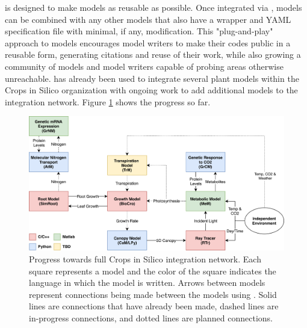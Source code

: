\documentclass[journal]{IEEEtran}
\newcommand{\todo}[1]{{\color{red}{#1}}}
\newcommand{\pkg}{{\tt \todo{cis\_interface}}{}}
\begin{document}
{\pkg} is designed to make models as reusable as possible. Once integrated via {\pkg}, models can be combined with any other models that also have a {\pkg} wrapper and YAML specification file with minimal, if any, modification. This "plug-and-play" approach to models encourages model writers to make their codes public in a reusable form, generating citations and reuse of their work, while also growing a community of models and model writers capable of probing areas otherwise unreachable. 
%
{\pkg} has already been used to integrate several plant models within the Crops in Silico organization \citep{Marshall-Colon2017} with ongoing work to add additional models to the integration network. Figure \ref{fig:network} shows the progress so far. 
%
\ifinclfig
 	\begin{figure}[htbp]
	\begin{center}
	\includegraphics[width=\columnwidth,keepaspectratio]{./images/CiS-Languages.png}
	\caption{Progress towards full Crops in Silico integration network. Each square represents a model and the color of the square indicates the language in which the model is written. Arrows between models represent connections being made between the models using {\pkg}. Solid lines are connections that have already been made, dashed lines are in-progress connections, and dotted lines are planned connections.}
	\label{fig:network}
	\end{center}
	\end{figure}
\end{document}
